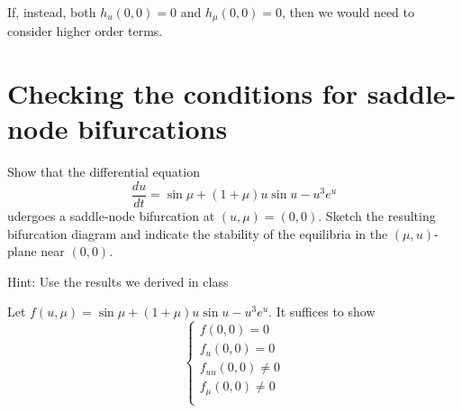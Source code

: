 \documentclass[12pt]{article}
\begin{document}
\begin{enumerate}
          \begin{center}
              \color{black}
          \end{center}

          If, instead, both $h_u(0, 0) = 0$ and $h_{\mu}(0, 0) = 0$, then we would need to consider higher order terms.
          \color{black}

\end{enumerate}
\pagebreak

\section{Checking the conditions for saddle-node bifurcations}
Show that the differential equation
\[\frac{du}{dt} = \sin \mu+ (1+ \mu) u \sin u - u^3 e^u \]
udergoes a saddle-node bifurcation at $(u, \mu) = (0, 0)$. Sketch the resulting bifurcation diagram and indicate the stability of the equilibria in the $(\mu, u)$-plane near $(0, 0)$.

Hint: Use the results we derived in class

\color{blue}
Let $f(u, \mu) = \sin \mu+ (1+ \mu) u \sin u - u^3 e^u$. It suffices to show
\[\begin{cases}
        f(0, 0) =0           \\
        f_u(0, 0 ) = 0       \\
        f_{uu}(0, 0) \neq 0  \\
        f_{\mu}(0, 0) \neq 0 \\
    \end{cases}\]
\end{document}
